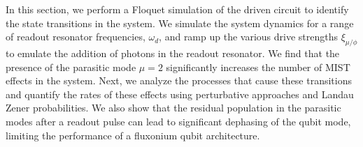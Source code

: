 \documentclass[%
reprint,
superscriptaddress,
 amsmath,amssymb,
 aps,
 prx,
longbibliography,
floatfix,
]{revtex4-2}
\begin{document}
In this section, we perform a Floquet simulation of the driven circuit to identify the state transitions in the system. We simulate the system dynamics for a range of readout resonator frequencies, $\omega_d$, and ramp up the various drive strengths $\xi_{\mu/\phi}$ to emulate the addition of photons in the readout resonator. We find that the presence of the parasitic mode $\mu=2$ significantly increases the number of MIST effects in the system. Next, we analyze the processes that cause these transitions and quantify the rates of these effects using perturbative approaches and Landau Zener probabilities. We also show that the residual population in the parasitic modes after a readout pulse can lead to significant dephasing of the qubit mode, limiting the performance of a fluxonium qubit architecture.
\end{document}
